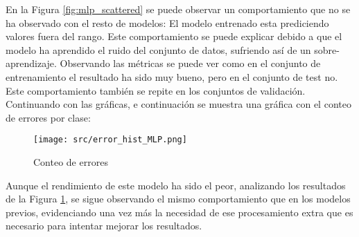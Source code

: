 En la Figura \ref{fig:mlp_scattered} se puede observar un comportamiento que no se ha observado con el resto de modelos: El modelo entrenado esta prediciendo valores fuera del rango. Este comportamiento se puede explicar debido a que el modelo ha aprendido el ruido del conjunto de datos, sufriendo así de un sobre-aprendizaje. Observando las métricas se puede ver como en el conjunto de entrenamiento el resultado ha sido muy bueno, pero en el conjunto de test no. Este comportamiento también se repite en los conjuntos de validación.
\clearpage
Continuando con las gráficas, e continuación se muestra una gráfica con el conteo de errores por clase:
\begin{figure}[H]
	\centering	\texttt{[image: src/error\_hist\_MLP.png]}
	\caption{Conteo de errores}
	\label{fig:mlp_error_plot}
\end{figure}
Aunque el rendimiento de este modelo ha sido el peor, analizando los resultados de la Figura \ref{fig:mlp_error_plot}, se sigue observando el mismo comportamiento que en los modelos previos, evidenciando una vez más la necesidad de ese procesamiento extra que es necesario para intentar mejorar los resultados.
\clearpage
